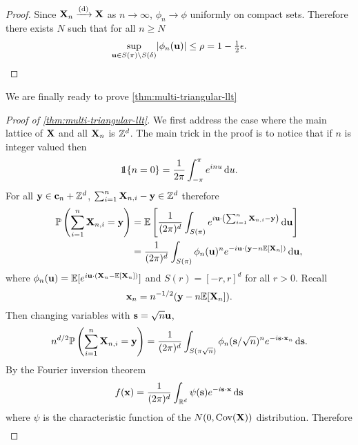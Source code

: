 \begin{proof}
    Since ${\mathbf X}_n \xrightarrow[]{\mathrm{(d)}} {\mathbf X}$ as $n \to \infty$, $\phi_n \to \phi$ uniformly on compact sets. Therefore there exists $N$ such that for all $n \geq N$
    \begin{equation*}
        \sup_{{\mathbf u} \in S(\pi) \setminus S(\delta)} \lvert\phi_n({\mathbf u})\rvert \leq \rho = 1 - \tfrac{1}{2} \epsilon. \qedhere
    \end{equation*}
\end{proof}

We are finally ready to prove \cref{thm:multi-triangular-llt}

\begin{proof}[Proof of \cref{thm:multi-triangular-llt}]
    We first address the case where the main lattice of ${\mathbf X}$ and all ${\mathbf X}_n$ is ${\mathbb Z}^d$. The main trick in the proof is to notice that if $n$ is integer valued then
    \begin{equation*}
        \one\{n = 0\} = \frac{1}{2\pi} \int_{-\pi}^{\pi} e^{i n u} \dif u.
    \end{equation*}
    For all ${\mathbf y} \in {\mathbf c}_n + {\mathbb Z}^d$, $\sum_{i=1}^n {\mathbf X}_{n, i} - {\mathbf y} \in {\mathbb Z}^d$ therefore 
    \begin{align*}
        {\mathbb P}\left( \sum_{i=1}^n {\mathbf X}_{n, i} = {\mathbf y} \right)
        &= {\mathbb E}\left[ 
            \frac{1}{(2 \pi)^d} \int_{S(\pi)} e^{i {\mathbf u} \cdot \left(\sum_{i=1}^n {\mathbf X}_{n, i} - {\mathbf y}\right)} \mathop{}\!\mathrm{d} {\mathbf u}
         \right] \\
        &= \frac{1}{(2 \pi)^d} \int_{S(\pi)} \phi_n({\mathbf u})^n e^{-i {\mathbf u} \cdot ({\mathbf y} - n {\mathbb E}[{\mathbf X}_n])} \mathop{}\!\mathrm{d} {\mathbf u},
    \end{align*}
    where $\phi_n({\mathbf u}) = {\mathbb E}[e^{i {\mathbf u} \cdot ({\mathbf X}_n - {\mathbb E}[{\mathbf X}_n])}]$ and $S(r) = [-r, r]^d$ for all $r > 0$. Recall
    \begin{equation*}
        {\mathbf x}_n = n^{-1/2}({\mathbf y} - n {\mathbb E}[{\mathbf X}_n]).
    \end{equation*}
    Then changing variables with ${\mathbf s} = \sqrt{n} {\mathbf u}$,
    \begin{equation*}
        n^{d/2} {\mathbb P}\left( \sum_{i=1}^n {\mathbf X}_{n, i} = {\mathbf y} \right)
        = \frac{1}{(2 \pi)^d} \int_{S(\pi\sqrt{n})} \phi_n({\mathbf s}/\sqrt{n})^n e^{-i {\mathbf s} \cdot {\mathbf x}_n} \mathop{}\!\mathrm{d} {\mathbf s}.
    \end{equation*}
    By the Fourier inversion theorem
    \begin{equation*}
        f({\mathbf x}) = \frac{1}{(2 \pi)^d} \int_{{\mathbb R}^d} \psi({\mathbf s}) e^{-i {\mathbf s} \cdot {\mathbf x}} \mathop{}\!\mathrm{d} {\mathbf s}
    \end{equation*}
    where $\psi$ is the characteristic function of the $N(0, \operatorname{Cov}({\mathbf X}))$ distribution. Therefore
    \begin{align*}

\end{align*}
\end{proof}
